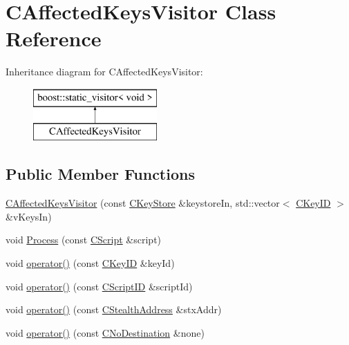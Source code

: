\hypertarget{class_c_affected_keys_visitor}{}\section{C\+Affected\+Keys\+Visitor Class Reference}
\label{class_c_affected_keys_visitor}
Inheritance diagram for C\+Affected\+Keys\+Visitor\+:\begin{figure}[H]
\begin{center}
\leavevmode
\includegraphics[height=2.000000cm]{class_c_affected_keys_visitor}
\end{center}
\end{figure}
\subsection*{Public Member Functions}
\begin{DoxyCompactItemize}
\item 
\hyperlink{class_c_affected_keys_visitor_a97f7f932abb21ae791993a284183ab89}{C\+Affected\+Keys\+Visitor} (const \hyperlink{class_c_key_store}{C\+Key\+Store} \&keystore\+In, std\+::vector$<$ \hyperlink{class_c_key_i_d}{C\+Key\+I\+D} $>$ \&v\+Keys\+In)
\item 
void \hyperlink{class_c_affected_keys_visitor_a749859ce2a826e2d60c8fe31685efae3}{Process} (const \hyperlink{class_c_script}{C\+Script} \&script)
\item 
void \hyperlink{class_c_affected_keys_visitor_abc13269c85eb964555cfe23c60b8c9b1}{operator()} (const \hyperlink{class_c_key_i_d}{C\+Key\+I\+D} \&key\+Id)
\item 
void \hyperlink{class_c_affected_keys_visitor_a01b52c5a4311ae3985d1e5753e033215}{operator()} (const \hyperlink{class_c_script_i_d}{C\+Script\+I\+D} \&script\+Id)
\item 
void \hyperlink{class_c_affected_keys_visitor_a34c60e9fafd77a10a30346b4f2ff1311}{operator()} (const \hyperlink{class_c_stealth_address}{C\+Stealth\+Address} \&stx\+Addr)
\item 
void \hyperlink{class_c_affected_keys_visitor_abeff400fed1ba87283930538f9164640}{operator()} (const \hyperlink{class_c_no_destination}{C\+No\+Destination} \&none)
\end{DoxyCompactItemize}


